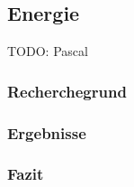 \subsection{Energie}

TODO: Pascal

\subsubsection{Recherchegrund}


\subsubsection{Ergebnisse}



\subsubsection{Fazit}

\clearpage 





